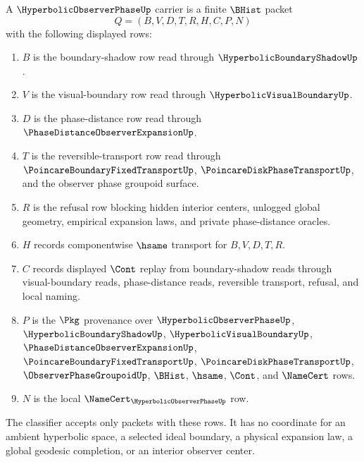 \begin{definition}\label{def:hyperbolic-observer-phase-carrier}
A $\HyperbolicObserverPhaseUp$ carrier is a finite $\BHist$ packet
$$
Q=(B,V,D,T,R,H,C,P,N)
$$
with the following displayed rows:
\begin{enumerate}
\item $B$ is the boundary-shadow row read through $\HyperbolicBoundaryShadowUp$.
\item $V$ is the visual-boundary row read through $\HyperbolicVisualBoundaryUp$.
\item $D$ is the phase-distance row read through $\PhaseDistanceObserverExpansionUp$.
\item $T$ is the reversible-transport row read through $\PoincareBoundaryFixedTransportUp$, $\PoincareDiskPhaseTransportUp$, and the observer phase groupoid surface.
\item $R$ is the refusal row blocking hidden interior centers, unlogged global geometry, empirical expansion laws, and private phase-distance oracles.
\item $H$ records componentwise $\hsame$ transport for $B,V,D,T,R$.
\item $C$ records displayed $\Cont$ replay from boundary-shadow reads through visual-boundary reads, phase-distance reads, reversible transport, refusal, and local naming.
\item $P$ is the $\Pkg$ provenance over $\HyperbolicObserverPhaseUp$, $\HyperbolicBoundaryShadowUp$, $\HyperbolicVisualBoundaryUp$, $\PhaseDistanceObserverExpansionUp$, $\PoincareBoundaryFixedTransportUp$, $\PoincareDiskPhaseTransportUp$, $\ObserverPhaseGroupoidUp$, $\BHist$, $\hsame$, $\Cont$, and $\NameCert$ rows.
\item $N$ is the local $\NameCert_{\HyperbolicObserverPhaseUp}$ row.
\end{enumerate}
The classifier accepts only packets with these rows. It has no coordinate for an ambient hyperbolic space, a selected ideal boundary, a physical expansion law, a global geodesic completion, or an interior observer center.
\end{definition}

